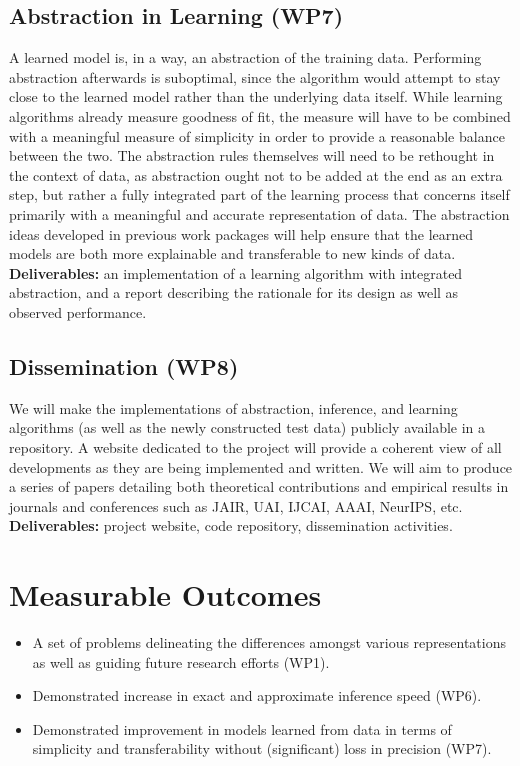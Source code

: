 \documentclass[11pt,english,twocolumn]{article}
\begin{document}
\subsection*{Abstraction in Learning (WP7)}

A learned model is, in a way, an abstraction of the training data. Performing
abstraction afterwards is suboptimal, since the algorithm would attempt to
stay close to the learned model rather than the underlying data itself. While
learning algorithms already measure goodness of fit, the measure will have to be
combined with a meaningful measure of simplicity in order to provide a
reasonable balance between the two. The abstraction rules themselves will need
to be rethought in the context of data, as abstraction ought not to be added at
the end as an extra step, but rather a fully integrated part of the learning
process that concerns itself primarily with a meaningful and accurate
representation of data. The abstraction ideas developed in previous work
packages will help ensure that the learned models are both more explainable and
transferable to new kinds of data. \textbf{Deliverables:} an implementation of a
learning algorithm with integrated abstraction, and a report describing the
rationale for its design as well as observed performance.

\subsection*{Dissemination (WP8)}

We will make the implementations of abstraction, inference, and learning
algorithms (as well as the newly constructed test data) publicly available in a
repository. A website dedicated to the project will provide a coherent view of
all developments as they are being implemented and written. We will aim to
produce a series of papers detailing both theoretical contributions and
empirical results in journals and conferences such as JAIR, UAI, IJCAI, AAAI,
NeurIPS, etc. \textbf{Deliverables:} project website, code repository,
dissemination activities.

\section{Measurable Outcomes}

\begin{itemize}
\item A set of problems delineating the differences amongst various
  representations as well as guiding future research efforts (WP1).
\item Demonstrated increase in exact and approximate inference speed (WP6).
\item Demonstrated improvement in models learned from data in terms of
  simplicity and transferability without (significant) loss in precision (WP7).
\end{itemize}
\end{document}
